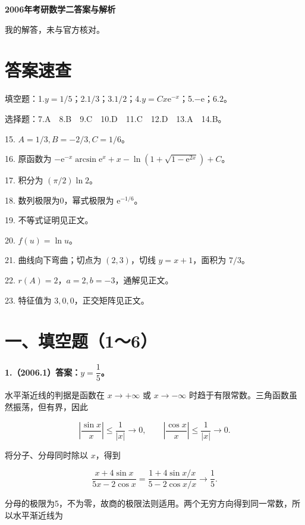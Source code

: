 \documentclass[UTF8,11pt,fontset=windows]{ctexart}
\begin{document}
{\LARGE\bfseries 2006年考研数学二答案与解析\par}\vspace{6pt}

\begingroup\color{gray}我的解答，未与官方核对。\par\endgroup

\section*{答案速查}

\begingroup\color{gray}填空题：1.$y=1/5$；2.$1/3$；3.$1/2$；4.$y=Cx\mathrm e^{-x}$；5.$-\mathrm e$；6.$2$。\par\endgroup

\begingroup\color{gray}选择题：7.A　8.B　9.C　10.D　11.C　12.D　13.A　14.B。\par\endgroup

15. $A=1/3,B=-2/3,C=1/6$。

16. 原函数为 $-\mathrm e^{-x}\arcsin\mathrm e^x+x-\ln(1+\sqrt{1-\mathrm e^{2x}})+C$。

17. 积分为 $(\pi/2)\ln2$。

18. 数列极限为0，幂式极限为 $\mathrm e^{-1/6}$。

19. 不等式证明见正文。

20. $f(u)=\ln u$。

21. 曲线向下弯曲；切点为 $(2,3)$，切线 $y=x+1$，面积为 $7/3$。

22. $r(A)=2$，$a=2,b=-3$，通解见正文。

23. 特征值为 $3,0,0$，正交矩阵见正文。

\clearpage

\section*{一、填空题（1～6）}

\textbf{1.（2006.1）答案：$y=\dfrac15$。}

水平渐近线的判据是函数在 $x\to+\infty$ 或 $x\to-\infty$ 时趋于有限常数。三角函数虽然振荡，但有界，因此

$$
\left|\frac{\sin x}{x}\right|\le\frac1{|x|}\longrightarrow0,
\qquad
\left|\frac{\cos x}{x}\right|\le\frac1{|x|}\longrightarrow0.
$$

将分子、分母同时除以 $x$，得到

$$
\frac{x+4\sin x}{5x-2\cos x}
=\frac{1+4\sin x/x}{5-2\cos x/x}
\longrightarrow\frac15.
$$

分母的极限为5，不为零，故商的极限法则适用。两个无穷方向得到同一常数，所以水平渐近线为
\end{document}
